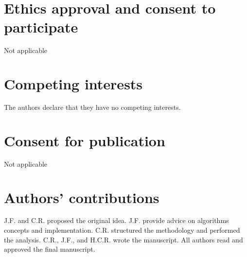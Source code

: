 \documentclass{bmcart}
\begin{document}
\begin{backmatter}
\section*{Ethics approval and consent to participate}%
Not applicable

\section*{Competing interests}
The authors declare that they have no competing interests.

\section*{Consent for publication}%
Not applicable

\section*{Authors' contributions}
J.F. and C.R. proposed the original idea. 
J.F. provide advice on algorithms concepts and implementation.
C.R. structured the methodology and performed the analysis. 
C.R., J.F., and H.C.R. wrote the manuscript.
All authors read and approved the final manuscript.





\end{backmatter}
\end{document}
